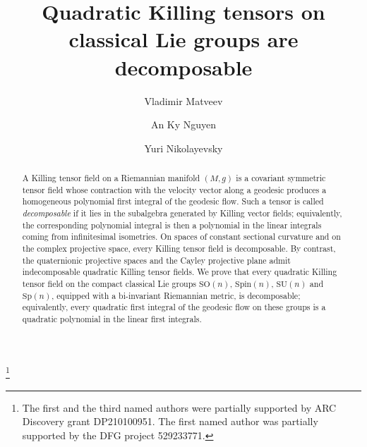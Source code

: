 \documentclass[12pt,reqno]{amsart}
\newcommand \SO{\mathrm{SO}}
\newcommand \Sp{\mathrm{Sp}}
\newcommand \SU{\mathrm{SU}}
\newcommand \Spin{\mathrm{Spin}}
\newcommand \<{\langle}
\renewcommand \>{\rangle}
\theoremstyle{definition}
\theoremstyle{remark}
\begin{document}
	
	\title[Quadratic Killing tensors on classical Lie groups are decomposable]{Quadratic Killing tensors on classical Lie groups are decomposable}
	
	\author{Vladimir Matveev}
	\address{Fakult\"{a}t f\"{u}r Mathematik und Informatik\\ Friedrich-Schiller-Universit\"{a}t\\ 07737 Jena, Germany}
	
	\author{An Ky Nguyen}
	\address{Department of Mathematical and Physical Sciences\\ La Trobe University\\ Melbourne, Victoria 3086, Australia}
	
	\author{Yuri Nikolayevsky}
	\address{Department of Mathematical and Physical Sciences\\ La Trobe University\\ Melbourne, Victoria 3086, Australia}
	
	\thanks{The first and the third named authors were partially supported by ARC Discovery grant DP210100951. The first named author was partially supported by the DFG project 529233771.}
	
	
	
	
	\begin{abstract}
		A Killing tensor field on a Riemannian manifold $(M,g)$ is a covariant symmetric tensor field whose contraction with the velocity vector along a geodesic produces a homogeneous polynomial first integral of the geodesic flow. Such a tensor is called \emph{decomposable} if it lies in the subalgebra generated by Killing vector fields; equivalently, the corresponding polynomial integral is then a polynomial in the linear integrals coming from infinitesimal isometries. On spaces of constant sectional curvature and on the complex projective space, every Killing tensor field is decomposable. By contrast, the quaternionic projective spaces and the Cayley projective plane admit indecomposable quadratic Killing tensor fields. We prove that every quadratic Killing tensor field on the compact classical Lie groups $\SO(n)$, $\Spin(n)$, $\SU(n)$ and $\Sp(n)$, equipped with a bi-invariant Riemannian metric, is decomposable; equivalently, every quadratic first integral of the geodesic flow on these groups is a quadratic polynomial in the linear first integrals. 
	\end{abstract}
	
\end{document}

